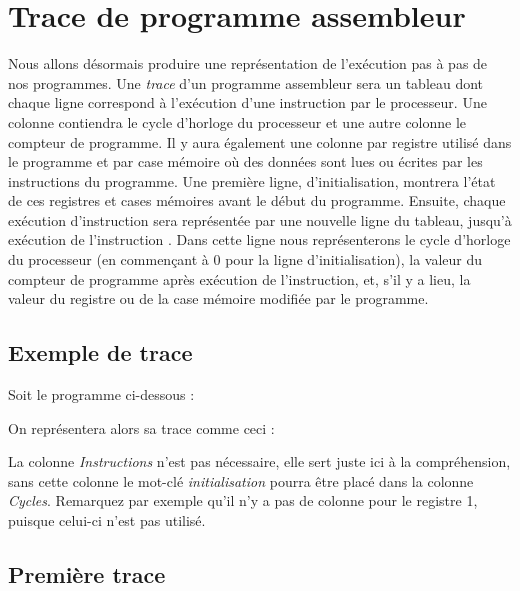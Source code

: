 \section{Trace de programme assembleur}
Nous allons désormais produire une représentation de l'exécution pas à pas de nos programmes. Une \emph{trace} d'un programme assembleur sera un tableau dont chaque ligne correspond à l'exécution d'une instruction par le processeur.  Une colonne contiendra le cycle d'horloge du processeur et une autre colonne le compteur de programme. Il y aura également une colonne par registre utilisé dans le programme et par case mémoire où des données sont lues ou écrites par les instructions du programme. Une première ligne, d'initialisation, montrera l'état de ces registres et cases mémoires avant le début du programme. Ensuite, chaque exécution d'instruction sera représentée par une nouvelle ligne du tableau, jusqu'à exécution de l'instruction . Dans cette ligne nous représenterons le cycle d'horloge du processeur (en commençant à 0 pour la ligne d'initialisation),  la valeur du compteur de programme après exécution de l'instruction, et, s'il y a lieu, la valeur du registre ou de la case mémoire modifiée par le programme. 

\subsection{Exemple de trace}


\begin{minipage}[t]{0.35\linewidth}
Soit le programme ci-dessous :

\end{minipage}\hfill
\begin{minipage}[t]{0.6\linewidth}
On représentera alors sa trace comme ceci : 
\bigskip


\end{minipage}
\medskip

La colonne \emph{Instructions} n'est pas nécessaire, elle sert juste ici à la compréhension, sans cette colonne le mot-clé \emph{initialisation} pourra être placé dans la colonne \emph{Cycles}. Remarquez par exemple qu'il n'y a pas de colonne pour le registre 1, puisque celui-ci n'est pas utilisé.

\subsection{Première trace}

